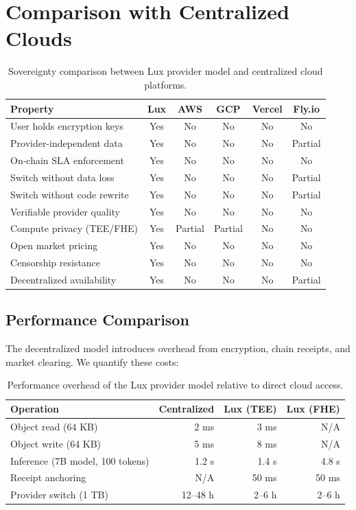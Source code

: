 \section{Comparison with Centralized Clouds}
\label{sec:comparison}

\begin{table}[H]
\centering
\caption{Sovereignty comparison between Lux provider model and centralized cloud platforms.}
\label{tab:comparison}
\begin{tabular}{p{3.5cm}ccccc}
\toprule
\textbf{Property} & \textbf{Lux} & \textbf{AWS} & \textbf{GCP} & \textbf{Vercel} & \textbf{Fly.io} \\
\midrule
User holds encryption keys & Yes & No & No & No & No \\
Provider-independent data & Yes & No & No & No & Partial \\
On-chain SLA enforcement & Yes & No & No & No & No \\
Switch without data loss & Yes & No & No & No & Partial \\
Switch without code rewrite & Yes & No & No & No & Partial \\
Verifiable provider quality & Yes & No & No & No & No \\
Compute privacy (TEE/FHE) & Yes & Partial & Partial & No & No \\
Open market pricing & Yes & No & No & No & No \\
Censorship resistance & Yes & No & No & No & No \\
Decentralized availability & Yes & No & No & No & Partial \\
\bottomrule
\end{tabular}
\end{table}

\subsection{Performance Comparison}

The decentralized model introduces overhead from encryption, chain
receipts, and market clearing. We quantify these costs:

\begin{table}[H]
\centering
\caption{Performance overhead of the Lux provider model relative to direct cloud access.}
\label{tab:performance}
\begin{tabular}{lrrr}
\toprule
\textbf{Operation} & \textbf{Centralized} & \textbf{Lux (TEE)} & \textbf{Lux (FHE)} \\
\midrule
Object read (64 KB) & 2 ms & 3 ms & N/A \\
Object write (64 KB) & 5 ms & 8 ms & N/A \\
Inference (7B model, 100 tokens) & 1.2 s & 1.4 s & 4.8 s \\
Receipt anchoring & N/A & 50 ms & 50 ms \\
Provider switch (1 TB) & 12--48 h & 2--6 h & 2--6 h \\
\bottomrule
\end{tabular}
\end{table}


